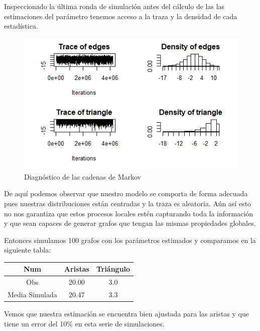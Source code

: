 Inspeccionado la última ronda de simulación antes del cálculo de las las estimaciones del parámetro tenemos acceso a la traza y la densidad de cada estadística.

\begin{figure}[t]
\includegraphics[width=1\textwidth]{Tesis/Figures/mcmcflorentine.jpg}
\caption{Diagnóstico de las cadenas de Markov}
\centering
\end{figure}

De aquí podemos observar que nuestro modelo se comporta de forma adecuada pues nuestras distribuciones están centradas y la traza es aleatoria. Aún así esto no nos garantiza que estos procesos locales estén capturando toda la información y que sean capaces de generar grafos que tengan las mismas propiedades globales.

Entonces simulamos 100 grafos con los parámetros estimados y comparamos en la siguiente tabla:

\begin{center}
 \begin{tabular}{||c c c||} 
 \hline
 Num & Aristas & Triángulo \\ [.5ex] 
 \hline\hline
 Obs & 20.00 & 3.0 \\ 
 \hline
 Media Simulada & 20.47 & 3.3  \\
 \hline
\end{tabular}
\end{center}

Vemos que nuestra estimación se encuentra bien ajustada para las aristas y que tiene un error del 10\% en esta serie de simulaciones.

